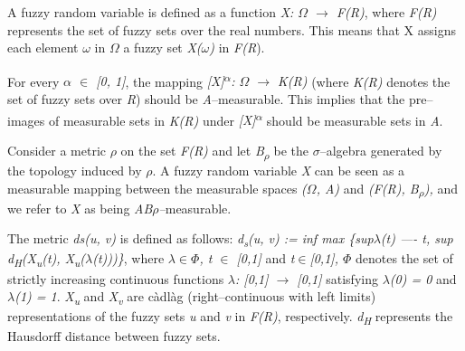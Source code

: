 \documentclass[12pt,a4paper]{report}
\numberwithin{equation}{section}
\begin{document}
A fuzzy random variable is defined as a function \emph{X: $\Omega$ $\rightarrow$ F(R)},
where \emph{F(R)} represents the set of fuzzy sets over the real
numbers. This means that X assigns each element \emph{$\omega$} in \emph{$\Omega$} a
fuzzy set \emph{X($\omega$)} in \emph{F(R}).

For every \emph{$\alpha$ $\in$ {[}0, 1{]}}, the mapping
\emph{{[}X{]}\textsuperscript{$\alpha$}: $\Omega$ $\rightarrow$ K(R)} (where \emph{K(R)} denotes
the set of fuzzy sets over \emph{R}) should be \emph{A}--measurable. This
implies that the pre--images of measurable sets in \emph{K(R)} under
\emph{{[}X{]}\textsuperscript{$\alpha$}} should be measurable sets in \emph{A}.

Consider a metric \emph{$\rho$} on the set \emph{F(R)} and let
\emph{B\textsubscript{$\rho$}} be the $\sigma$--algebra generated by the topology
induced by \emph{$\rho$}. A fuzzy random variable \emph{X} can be seen as a
measurable mapping between the measurable spaces \emph{($\Omega$, A)} and
\emph{(F(R), B\textsubscript{$\rho$}),} and we refer to \emph{X} as being
\emph{A\textbar B$\rho$--}measurable.

The metric \emph{ds(u, v)} is defined as follows:
\emph{d\textsubscript{s}(u, v) := inf max \{sup\textbar $\lambda$(t) ----
t\textbar, sup d\textsubscript{H}(X\textsubscript{u}(t),
X\textsubscript{u}($\lambda$(t)))\}}, where \emph{$\lambda$$\in$$\Phi$, t $\in$ {[}0,1{]}} and
\emph{t$\in${[}0,1{]}, $\Phi$} denotes the set of strictly increasing continuous
functions \emph{$\lambda$: {[}0,1{]} $\rightarrow$ {[}0,1{]}} satisfying \emph{$\lambda$(0) = 0} and
\emph{$\lambda$(1) = 1}. \emph{X\textsubscript{u}} and \emph{X\textsubscript{v}}
are càdlàg (right--continuous with left limits) representations of the
fuzzy sets \emph{u} and \emph{v} in \emph{F(R)}, respectively.
\emph{d\textsubscript{H}} represents the Hausdorff distance between
fuzzy sets.
\end{document}
